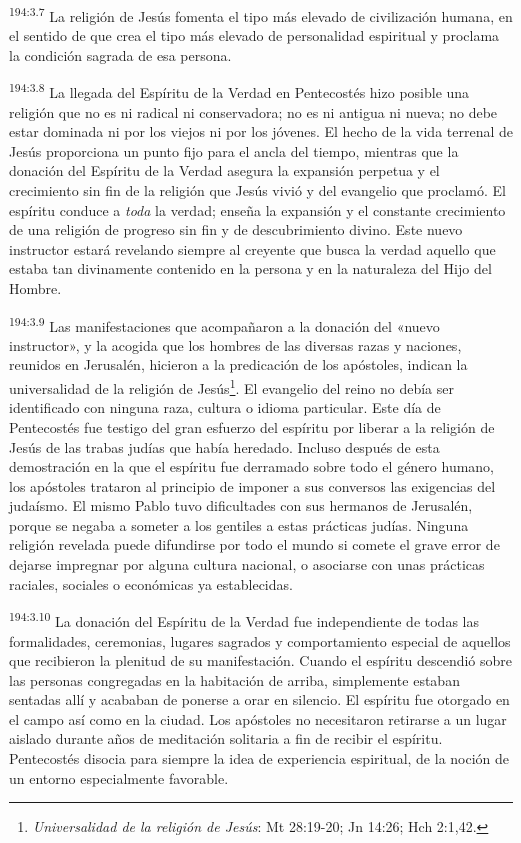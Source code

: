 \par 
\textsuperscript{194:3.7} La religión de Jesús fomenta el tipo más elevado de civilización humana, en el sentido de que crea el tipo más elevado de personalidad espiritual y proclama la condición sagrada de esa persona.

\par 
\textsuperscript{194:3.8} La llegada del Espíritu de la Verdad en Pentecostés hizo posible una religión que no es ni radical ni conservadora; no es ni antigua ni nueva; no debe estar dominada ni por los viejos ni por los jóvenes. El hecho de la vida terrenal de Jesús proporciona un punto fijo para el ancla del tiempo, mientras que la donación del Espíritu de la Verdad asegura la expansión perpetua y el crecimiento sin fin de la religión que Jesús vivió y del evangelio que proclamó. El espíritu conduce a \textit{toda} la verdad; enseña la expansión y el constante crecimiento de una religión de progreso sin fin y de descubrimiento divino. Este nuevo instructor estará revelando siempre al creyente que busca la verdad aquello que estaba tan divinamente contenido en la persona y en la naturaleza del Hijo del Hombre.

\par 
\textsuperscript{194:3.9} Las manifestaciones que acompañaron a la donación del «nuevo instructor», y la acogida que los hombres de las diversas razas y naciones, reunidos en Jerusalén, hicieron a la predicación de los apóstoles, indican la universalidad de la religión de Jesús\footnote{\textit{Universalidad de la religión de Jesús}: Mt 28:19-20; Jn 14:26; Hch 2:1,42.}. El evangelio del reino no debía ser identificado con ninguna raza, cultura o idioma particular. Este día de Pentecostés fue testigo del gran esfuerzo del espíritu por liberar a la religión de Jesús de las trabas judías que había heredado. Incluso después de esta demostración en la que el espíritu fue derramado sobre todo el género humano, los apóstoles trataron al principio de imponer a sus conversos las exigencias del judaísmo. El mismo Pablo tuvo dificultades con sus hermanos de Jerusalén, porque se negaba a someter a los gentiles a estas prácticas judías. Ninguna religión revelada puede difundirse por todo el mundo si comete el grave error de dejarse impregnar por alguna cultura nacional, o asociarse con unas prácticas raciales, sociales o económicas ya establecidas.

\par 
\textsuperscript{194:3.10} La donación del Espíritu de la Verdad fue independiente de todas las formalidades, ceremonias, lugares sagrados y comportamiento especial de aquellos que recibieron la plenitud de su manifestación. Cuando el espíritu descendió sobre las personas congregadas en la habitación de arriba, simplemente estaban sentadas allí y acababan de ponerse a orar en silencio. El espíritu fue otorgado en el campo así como en la ciudad. Los apóstoles no necesitaron retirarse a un lugar aislado durante años de meditación solitaria a fin de recibir el espíritu. Pentecostés disocia para siempre la idea de experiencia espiritual, de la noción de un entorno especialmente favorable.

